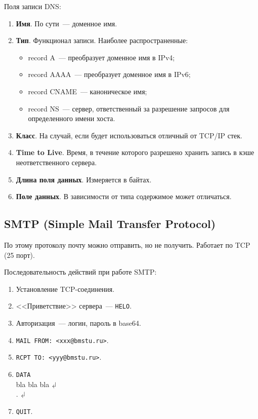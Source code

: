 Поля записи DNS:

\begin{enumerate}
    \item \textbf{Имя}. По сути~--- доменное имя.
    \item \textbf{Тип}. Функционал записи. Наиболее распространенные:
          \begin{itemize}
              \item record A~--- преобразует доменное имя в IPv4;
              \item record AAAA~--- преобразует доменное имя в IPv6;
              \item record CNAME~--- каноническое имя;
              \item record NS~--- сервер, ответственный за разрешение запросов для определенного
                    имени хоста.
          \end{itemize}
    \item \textbf{Класс}. На случай, если будет использоваться отличный от TCP/IP стек.
    \item \textbf{Time to Live}. Время, в течение которого разрешено хранить запись в кэше неответственного сервера.
    \item \textbf{Длина поля данных}. Измеряется в байтах.
    \item \textbf{Поле данных}. В зависимости от типа содержимое может отличаться.
\end{enumerate}

\subsection{SMTP (Simple Mail Transfer Protocol)}

По этому протоколу почту можно отправить, но не получить. Работает по TCP (25 порт).

Последовательность действий при работе SMTP:

\begin{enumerate}
    \item Установление TCP-соединения.
    \item <<Приветствие>> сервера~--- \texttt{HELO}.
    \item Авторизация~--- логин, пароль в base64.
    \item \texttt{MAIL FROM: <xxx@bmstu.ru>}.
    \item \texttt{RCPT TO: <yyy@bmstu.ru>}.
    \item \texttt{DATA}\\
          bla bla bla$\dlsh$\\
          .$\dlsh$
    \item \texttt{QUIT}.
\end{enumerate}

